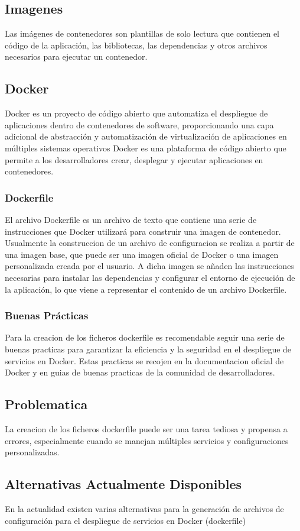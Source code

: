 \documentclass[12pt, a4paper, twoside]{article}
\begin{document}
\subsection{Imagenes}
Las imágenes de contenedores son plantillas de solo lectura que contienen el código de la aplicación, las bibliotecas, las dependencias y otros archivos necesarios para ejecutar un contenedor.
\subsection{Docker}
Docker es un proyecto de código abierto que automatiza el despliegue de aplicaciones dentro de contenedores de software, proporcionando una capa adicional de abstracción y automatización de virtualización de aplicaciones en múltiples sistemas operativos
Docker es una plataforma de código abierto que permite a los desarrolladores crear, desplegar y ejecutar aplicaciones en contenedores. 
\subsubsection{Dockerfile}
El archivo Dockerfile es un archivo de texto que contiene una serie de instrucciones que Docker utilizará para construir una imagen de contenedor.
Usualmente la construccion de un archivo de configuracion se realiza a partir de una imagen base, que puede ser una imagen oficial de Docker o una imagen personalizada creada por el usuario.
A dicha imagen se añaden las instrucciones necesarias para instalar las dependencias y configurar el entorno de ejecución de la aplicación, lo que viene a representar el contenido de un archivo Dockerfile.
\subsubsection{Buenas Prácticas}
Para la creacion de los ficheros dockerfile es recomendable seguir una serie de buenas practicas para garantizar la eficiencia y la seguridad en el despliegue de servicios en Docker.
Estas practicas se recojen en la documentacion oficial de Docker y en guias de buenas practicas de la comunidad de desarrolladores.
\subsection{Problematica}
La creacion de los ficheros dockerfile puede ser una tarea tediosa y propensa a errores, especialmente cuando se manejan múltiples servicios y configuraciones personalizadas.
\subsection{Alternativas Actualmente Disponibles}
En la actualidad existen varias alternativas para la generación de archivos de configuración para el despliegue de servicios en Docker (dockerfile)
\end{document}
